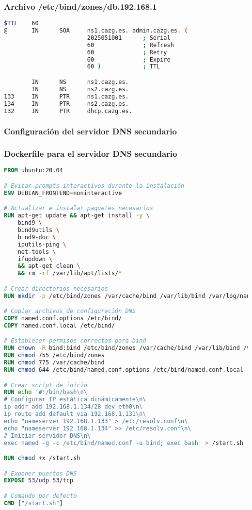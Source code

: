\subsubsection*{Archivo /etc/bind/zones/db.192.168.1}
\label{Apendice2:db.192.168.1_dns_primario}
\begin{lstlisting}[language=bash]
$TTL    60
@       IN      SOA     ns1.cazg.es. admin.cazg.es. (
                        2025051001      ; Serial
                        60              ; Refresh
                        60              ; Retry
                        60              ; Expire
                        60 )            ; TTL

        IN      NS      ns1.cazg.es.
        IN      NS      ns2.cazg.es.
133     IN      PTR     ns1.cazg.es.
134     IN      PTR     ns2.cazg.es.
132     IN      PTR     dhcp.cazg.es.
\end{lstlisting}

\subsubsection{Configuración del servidor DNS secundario}
\label{Apendice2:configuracion_dns_secundario}
\subsubsection*{Dockerfile para el servidor DNS secundario}
\begin{lstlisting}[language=Dockerfile]
FROM ubuntu:20.04

# Evitar prompts interactivos durante la instalación
ENV DEBIAN_FRONTEND=noninteractive

# Actualizar e instalar paquetes necesarios
RUN apt-get update && apt-get install -y \
    bind9 \
    bind9utils \
    bind9-doc \
    iputils-ping \
    net-tools \
    ifupdown \
    && apt-get clean \
    && rm -rf /var/lib/apt/lists/*

# Crear directorios necesarios
RUN mkdir -p /etc/bind/zones /var/cache/bind /var/lib/bind /var/log/named

# Copiar archivos de configuración DNS
COPY named.conf.options /etc/bind/
COPY named.conf.local /etc/bind/

# Establecer permisos correctos para bind
RUN chown -R bind:bind /etc/bind/zones /var/cache/bind /var/lib/bind /var/log/named
RUN chmod 755 /etc/bind/zones
RUN chmod 775 /var/cache/bind
RUN chmod 644 /etc/bind/named.conf.options /etc/bind/named.conf.local

# Crear script de inicio
RUN echo '#!/bin/bash\n\
# Configurar IP estática dinámicamente\n\
ip addr add 192.168.1.134/28 dev eth0\n\
ip route add default via 192.168.1.131\n\
echo "nameserver 192.168.1.133" > /etc/resolv.conf\n\
echo "nameserver 192.168.1.134" >> /etc/resolv.conf\n\
# Iniciar servidor DNS\n\
exec named -g -c /etc/bind/named.conf -u bind; exec bash' > /start.sh

RUN chmod +x /start.sh

# Exponer puertos DNS
EXPOSE 53/udp 53/tcp

# Comando por defecto
CMD ["/start.sh"] 
\end{lstlisting}

